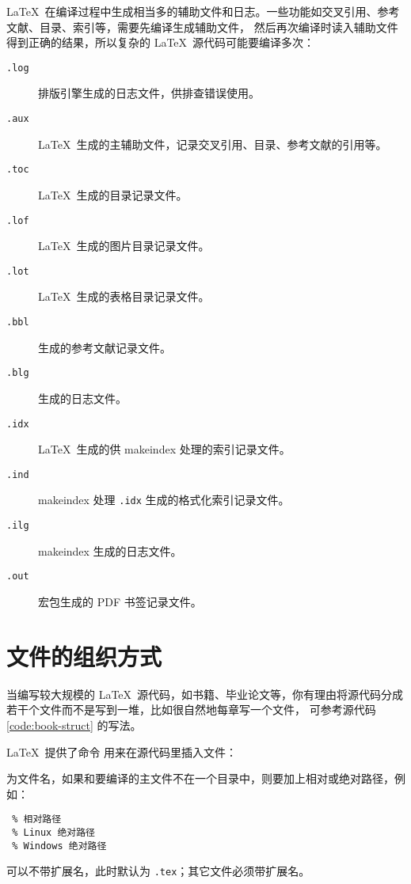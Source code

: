 \LaTeX\ 在编译过程中生成相当多的辅助文件和日志。一些功能如交叉引用、参考文献、目录、索引等，需要先编译生成辅助文件，
然后再次编译时读入辅助文件得到正确的结果，所以复杂的 \LaTeX\ 源代码可能要编译多次：
\begin{description}
  \item[\texttt{.log}] 排版引擎生成的日志文件，供排查错误使用。
  \item[\texttt{.aux}] \LaTeX\ 生成的主辅助文件，记录交叉引用、目录、参考文献的引用等。
  \item[\texttt{.toc}] \LaTeX\ 生成的目录记录文件。
  \item[\texttt{.lof}] \LaTeX\ 生成的图片目录记录文件。
  \item[\texttt{.lot}] \LaTeX\ 生成的表格目录记录文件。
  \item[\texttt{.bbl}]  生成的参考文献记录文件。
  \item[\texttt{.blg}]  生成的日志文件。
  \item[\texttt{.idx}] \LaTeX\ 生成的供 makeindex 处理的索引记录文件。
  \item[\texttt{.ind}] makeindex 处理 \texttt{.idx} 生成的格式化索引记录文件。
  \item[\texttt{.ilg}] makeindex 生成的日志文件。
  \item[\texttt{.out}]  宏包生成的 PDF 书签记录文件。
\end{description}

\section{文件的组织方式}\label{sec:latex-multi-files}

当编写较大规模的 \LaTeX\ 源代码，如书籍、毕业论文等，你有理由将源代码分成若干个文件而不是写到一堆，比如很自然地每章写一个文件，
可参考源代码 \ref{code:book-struct} 的写法。

\LaTeX\ 提供了命令  用来在源代码里插入文件：
\begin{command}
\end{command}
 为文件名，如果和要编译的主文件不在一个目录中，则要加上相对或绝对路径，例如：
\begin{verbatim}
 % 相对路径
 % Linux 绝对路径
 % Windows 绝对路径
\end{verbatim}

 可以不带扩展名，此时默认为 \texttt{.tex}；其它文件必须带扩展名。


